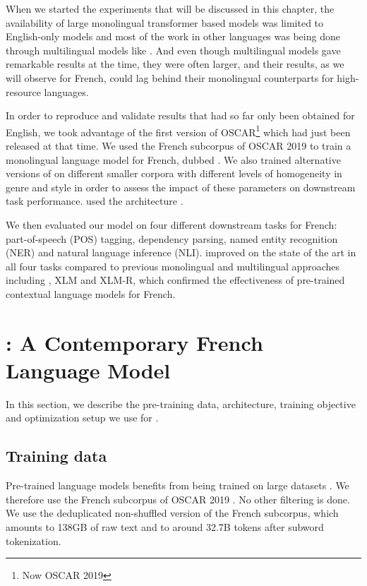 When we started the experiments that will be discussed in this chapter, the availability of large monolingual transformer based models was limited to English-only models \citep{devlin-etal-2019-bert,radford-etal-2019-language,liu-etal-2019-roberta,yang-etal-2019-xlnet,raffel-etal-2020-exploring} and most of the work in other languages was being done through multilingual models like \mbert \citep{devlin-etal-2019-bert}. And even though multilingual models gave remarkable results at the time, they were often larger, and their results, as we will observe for French, could lag behind their monolingual counterparts for high-resource languages.

In order to reproduce and validate results that had so far only been obtained for English, we took advantage of the first version of OSCAR\footnote{Now OSCAR 2019} \citep{ortiz-suarez-etal-2019-asynchronous} which had just been released at that time. We used the French subcorpus of OSCAR 2019 to train a monolingual language model for French, dubbed \camembert. We also trained alternative versions of \camembert on different smaller corpora with different levels of homogeneity in genre and style in order to assess the impact of these parameters on downstream task performance.
\camembert used the \roberta architecture \citep{liu-etal-2019-roberta}.

We then evaluated our model on four different downstream tasks for French: part-of-speech (POS) tagging, dependency parsing, named entity recognition (NER) and natural language inference (NLI). \camembert improved on the state of the art in all four tasks compared to previous monolingual and multilingual approaches including \mbert, XLM and XLM-R, which confirmed the effectiveness of pre-trained contextual language models for French.

\section{\camembert: A Contemporary French Language Model}\label{sec:Camembert}
In this section, we describe the pre-training data, architecture, training objective and optimization setup we use for \camembert.

\subsection{Training data}
Pre-trained language models benefits from being trained on large datasets \citep{devlin-etal-2019-bert,liu-etal-2019-roberta,raffel-etal-2020-exploring}. We therefore use the French subcorpus of OSCAR 2019 \citep{ortiz-suarez-etal-2019-asynchronous,ortiz-suarez-etal-2020-monolingual}. No other filtering is done. We use the deduplicated non-shuffled version of the French subcorpus, which amounts to 138GB of raw text and to around 32.7B tokens after subword tokenization.

